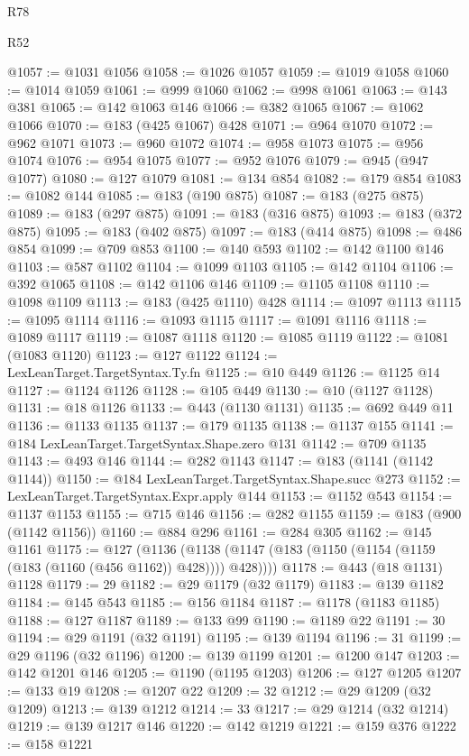 \begin{lexlean}{R78}
\begin{lexlean}{R52}
\begin{coremodule}
{{{{{{{{{{{{{{{{{{{{{{{{{{{{{{{{{{{{{{{{{{{{{{{{{{{{{{{{{{{{{{{{{{{{{{{{{{{{{{{{{{{{{{{{{{{{{{{{{{{{{{{{{{{{{{{{{{{{{{{{{{{{{{{{{{{{{{{{{{{{{{{{{{{{{{{{{{{{{{{{{{{{{{{{{{{{{{{{{{{{{{{{{{{{{{{{{{{{{{@1057 := @1031 @1056
@1058 := @1026 @1057
@1059 := @1019 @1058
@1060 := @1014 @1059
@1061 := @999 @1060
@1062 := @998 @1061
@1063 := @143 @381
@1065 := @142 @1063 @146
@1066 := @382 @1065
@1067 := @1062 @1066
@1070 := @183 (@425 @1067) @428
@1071 := @964 @1070
@1072 := @962 @1071
@1073 := @960 @1072
@1074 := @958 @1073
@1075 := @956 @1074
@1076 := @954 @1075
@1077 := @952 @1076
@1079 := @945 (@947 @1077)
@1080 := @127 @1079
@1081 := @134 @854
@1082 := @179 @854
@1083 := @1082 @144
@1085 := @183 (@190 @875)
@1087 := @183 (@275 @875)
@1089 := @183 (@297 @875)
@1091 := @183 (@316 @875)
@1093 := @183 (@372 @875)
@1095 := @183 (@402 @875)
@1097 := @183 (@414 @875)
@1098 := @486 @854
@1099 := @709 @853
@1100 := @140 @593
@1102 := @142 @1100 @146
@1103 := @587 @1102
@1104 := @1099 @1103
@1105 := @142 @1104
@1106 := @392 @1065
@1108 := @142 @1106 @146
@1109 := @1105 @1108
@1110 := @1098 @1109
@1113 := @183 (@425 @1110) @428
@1114 := @1097 @1113
@1115 := @1095 @1114
@1116 := @1093 @1115
@1117 := @1091 @1116
@1118 := @1089 @1117
@1119 := @1087 @1118
@1120 := @1085 @1119
@1122 := @1081 (@1083 @1120)
@1123 := @127 @1122
@1124 := LexLeanTarget.TargetSyntax.Ty.fn
@1125 := @10 @449
@1126 := @1125 @14
@1127 := @1124 @1126
@1128 := @105 @449
@1130 := @10 (@1127 @1128)
@1131 := @18 @1126
@1133 := @443 (@1130 @1131)
@1135 := @692 @449 @11
@1136 := @1133 @1135
@1137 := @179 @1135
@1138 := @1137 @155
@1141 := @184 LexLeanTarget.TargetSyntax.Shape.zero @131
@1142 := @709 @1135
@1143 := @493 @146
@1144 := @282 @1143
@1147 := @183 (@1141 (@1142 @1144))
@1150 := @184 LexLeanTarget.TargetSyntax.Shape.succ @273
@1152 := LexLeanTarget.TargetSyntax.Expr.apply @144
@1153 := @1152 @543
@1154 := @1137 @1153
@1155 := @715 @146
@1156 := @282 @1155
@1159 := @183 (@900 (@1142 @1156))
@1160 := @884 @296
@1161 := @284 @305
@1162 := @145 @1161
@1175 := @127
    (@1136 (@1138 (@1147 (@183 (@1150 (@1154 (@1159 (@183 (@1160 (@456 @1162)) @428)))) @428))))
@1178 := @443 (@18 @1131) @1128
@1179 := 29
@1182 := @29 @1179 (@32 @1179)
@1183 := @139 @1182
@1184 := @145 @543
@1185 := @156 @1184
@1187 := @1178 (@1183 @1185)
@1188 := @127 @1187
@1189 := @133 @99
@1190 := @1189 @22
@1191 := 30
@1194 := @29 @1191 (@32 @1191)
@1195 := @139 @1194
@1196 := 31
@1199 := @29 @1196 (@32 @1196)
@1200 := @139 @1199
@1201 := @1200 @147
@1203 := @142 @1201 @146
@1205 := @1190 (@1195 @1203)
@1206 := @127 @1205
@1207 := @133 @19
@1208 := @1207 @22
@1209 := 32
@1212 := @29 @1209 (@32 @1209)
@1213 := @139 @1212
@1214 := 33
@1217 := @29 @1214 (@32 @1214)
@1219 := @139 @1217 @146
@1220 := @142 @1219
@1221 := @159 @376
@1222 := @158 @1221
}}}}}}}}}}}}}}}}}}}}}}}}}}}}}}}}}}}}}}}}}}}}}}}}}}}}}}}}}}}}}}}}}}}}}}}}}}}}}}}}}}}}}}}}}}}}}}}}}}}}}}}}}}}}}}}}}}}}}}}}}}}}}}}}}}}}}}}}}}}}}}}}}}}}}}}}}}}}}}}}}}}}}}}}}}}}}}}}}}}}}}}}}}}}}}}}}}}}}}
\end{coremodule}
\end{lexlean}
\end{lexlean}
